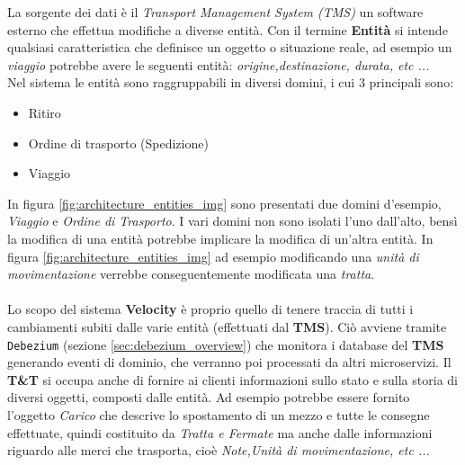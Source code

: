 La sorgente dei dati è il \textit{Transport Management System (TMS)} un software esterno che effettua modifiche a diverse entità.
Con il termine \textbf{Entità} si intende qualsiasi caratteristica che definisce un oggetto o situazione reale, ad esempio un \textit{viaggio} potrebbe avere le seguenti entità:
\textit{origine,destinazione, durata, etc ...}\\
Nel sistema le entità sono raggruppabili in diversi domini, i cui 3 principali sono:
\begin{itemize}
    \item Ritiro
    \item Ordine di trasporto (Spedizione)
    \item Viaggio
\end{itemize}
In figura \ref{fig:architecture_entities_img} sono presentati due domini d'esempio, \textit{Viaggio} e \textit{Ordine di Trasporto}.
I vari domini non sono isolati l'uno dall'alto, bensì la modifica di una entità potrebbe implicare la modifica di un'altra entità.
In figura \ref{fig:architecture_entities_img} ad esempio modificando una \textit{unità di movimentazione} verrebbe conseguentemente modificata una \textit{tratta}.
\\
\\
Lo scopo del sistema \textbf{Velocity} è proprio quello di tenere traccia di tutti i cambiamenti subiti dalle varie entità (effettuati dal \textbf{TMS}).
Ciò avviene tramite \texttt{Debezium} (sezione \ref{sec:debezium_overview}) che monitora i database del \textbf{TMS} generando eventi di dominio, che verranno poi processati da altri microservizi.
Il \textbf{T\&T} si occupa anche di fornire ai clienti informazioni sullo stato e sulla storia di diversi oggetti, composti dalle entità.
Ad esempio potrebbe essere fornito l'oggetto \textit{Carico} che descrive lo spostamento di un mezzo e tutte le consegne effettuate,
quindi costituito da \textit{Tratta e Fermate} ma anche dalle informazioni riguardo alle merci che trasporta, cioè \textit{Note,Unità di movimentazione, etc ...}

